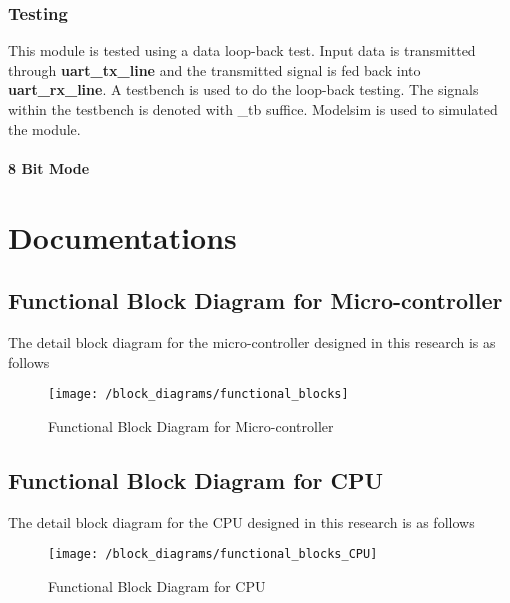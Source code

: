 \subsection{Testing}

This module is tested using a data loop-back test. Input data is transmitted through \textbf{uart\_tx\_line} and the transmitted signal is fed back into \textbf{uart\_rx\_line}. A testbench is used to do the loop-back testing. The signals within the testbench is denoted with \_tb suffice. Modelsim is used to simulated the module.

\subsubsection{8 Bit Mode}

\chapter{Documentations}


\section{Functional Block Diagram for Micro-controller}
The detail block diagram for the micro-controller designed in this research is as follows
\begin{figure}[!h]
	\centering
	\texttt{[image: /block\_diagrams/functional\_blocks]}
	\caption{Functional Block Diagram for Micro-controller}
\end{figure}

\section{Functional Block Diagram for CPU}
The detail block diagram for the CPU designed in this research is as follows
\begin{figure}[!h]
	\centering
	\texttt{[image: /block\_diagrams/functional\_blocks\_CPU]}
	\caption{Functional Block Diagram for CPU}
\end{figure}
